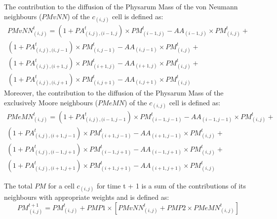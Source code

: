 \par
The contribution to the diffusion of the Physarum Mass of the von Neumann neighbours ($PMvNN$) of the $c_{(i,j)}$ cell is defined as:
\begin{equation}
\begin{split}
PMvNN^t_{(i, j)} = 
(1 + PA^t_{(i, j),(i-1, j}) \times PM^t_{(i-1, j)} - AA_{(i-1, j)} \times PM^t_{(i, j)} +
\\(1 + PA^t_{(i, j),(i, j-1}) \times PM^t_{(i, j-1)} - AA_{(i, j-1)} \times PM^t_{(i, j)} +
\\(1 + PA^t_{(i, j),(i+1, j}) \times PM^t_{(i+1, j)} - AA_{(i+1, j)} \times PM^t_{(i, j)}  +
\\(1 + PA^t_{(i, j),(i, j+1}) \times PM^t_{(i, j+1)} - AA_{(i, j+1)} \times PM^t_{(i, j)}
\end{split}
\end{equation}
Moreover, the contribution to the diffusion of the Physarum Mass of the exclusively Moore neighbours ($PMeMN$) of the $c_{(i,j)}$ cell is defined as:
\begin{equation}
\begin{split}
PMeMN^t_{(i, j)} = 
(1 + PA^t_{(i, j),(i-1, j-1}) \times PM^t_{(i-1, j-1)} - AA_{(i-1, j-1)} \times PM^t_{(i, j)} +
\\(1 + PA^t_{(i, j),(i+1, j-1}) \times PM^t_{(i+1, j-1)} - AA_{(i+1, j-1)} \times PM^t_{(i, j)} +
\\(1 + PA^t_{(i, j),(i-1, j+1}) \times PM^t_{(i-1, j+1)} - AA_{(i-1, j+1)} \times PM^t_{(i, j)}  +
\\(1 + PA^t_{(i, j),(i+1, j+1}) \times PM^t_{(i+1, j+1)} - AA_{(i+1, j+1)} \times PM^t_{(i, j)}
\end{split}
\end{equation}

The total $PM$ for a cell $c_{(i,j)}$ for time t + 1 is a sum of the contributions of its neighbours with appropriate weights and is defined as:
\begin{equation}
PM^{t+1}_{(i, j)} = PM^t_{(i, j)} + PMP1 \times [PMvNN^t_{(i, j)} + PMP2 \times PMeMN^t_{(i, j)}]
\end{equation}

